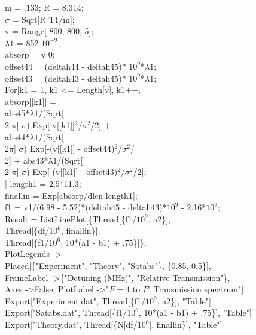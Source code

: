m = .133; R = 8.314;\\
$\sigma$ = Sqrt[R T1/m];\\
v = Range[-800, 800, 5];\\
$\lambda 1$ = 852 $10^{-9}$;\\
absorp = v 0;\\
offset44 = (deltah44 - deltah45)* $10^{9}$*$\lambda 1$;\\
offset43 = (deltah43 - deltah45)* $10^{9}$*$\lambda 1$;\\
For[k1 = 1, k1 \textless= Length[v], k1++,\\
 absorp[[k1]] = \\
   abs45*$\lambda 1$/(Sqrt[\\
         2 $\pi$] $\sigma$) Exp[-v[[k1]]$^2$/$\sigma^2$/2] + \\
    abs44*$\lambda 1$/(Sqrt[\\
         2$\pi$] $\sigma$) Exp[-(v[[k1]] - offset44)$^2$/$\sigma^2$/ \\
       2] + abs43*$\lambda 1$/(Sqrt[\\
         2 $\pi$] $\sigma$) Exp[-(v[[k1]] - offset43)$^2$/$\sigma^2$/2];\\
 ]
length1 = 2.5*11.3; \\
finallin = Exp[absorp/dlen length1];\\
f1 = v1/(6.98 - 5.52)*(deltah45 - deltah43)*$10^{9}$ - 2.16*$10^{9}$;\\
Result = ListLinePlot[\{Thread[\{f1/$10^{9}$, a2\}], \\
   Thread[\{df/$10^{6}$, finallin\}], \\
   Thread[\{f1/$10^{6}$, 10*(a1 - b1) + .75\}]\}, \\
  PlotLegends -\textgreater \\
   Placed[\{"Experiment", "Theory", "Satabs"\}, \{0.85, 0.5\}], \\
  FrameLabel -\textgreater \{"Detuning (MHz)", "Relative Transmission"\}, \\
  Axes -\textgreater False, PlotLabel -\textgreater "$F=4$ to $F'$ Transmission spectrum"]\\

Export["Experiment.dat", Thread[\{f1/$10^{9}$, a2\}], "Table"]\\
Export["Satabs.dat", Thread[\{f1/$10^{6}$, 10*(a1 - b1) + .75\}], "Table"]\\
Export["Theory.dat", Thread[\{N[df/$10^{6}$], finallin\}], "Table"]\\



